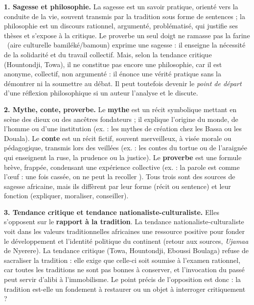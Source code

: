 \documentclass[11pt]{article}
\begin{document}
\begin{corrige}

\textbf{1. Sagesse et philosophie.} La sagesse est un savoir pratique, orienté vers la conduite de la vie, souvent transmis par la tradition sous forme de sentences ; la philosophie est un discours rationnel, argumenté, problématisé, qui justifie ses thèses et s'expose à la critique. Le proverbe \guillemotleft un seul doigt ne ramasse pas la farine \guillemotright\ (aire culturelle bamiléké/bamoun) exprime une sagesse : il enseigne la nécessité de la solidarité et du travail collectif. Mais, selon la tendance critique (Hountondji, Towa), il ne constitue pas encore une philosophie, car il est anonyme, collectif, non argumenté : il énonce une vérité pratique sans la démontrer ni la soumettre au débat. Il peut toutefois devenir le \emph{point de départ} d'une réflexion philosophique si un auteur l'analyse et le discute.

\textbf{2. Mythe, conte, proverbe.} Le \textbf{mythe} est un récit symbolique mettant en scène des dieux ou des ancêtres fondateurs ; il explique l'origine du monde, de l'homme ou d'une institution (ex. : les mythes de création chez les Bassa ou les Douala). Le \textbf{conte} est un récit fictif, souvent merveilleux, à visée morale ou pédagogique, transmis lors des veillées (ex. : les contes du tortue ou de l'araignée qui enseignent la ruse, la prudence ou la justice). Le \textbf{proverbe} est une formule brève, frappée, condensant une expérience collective (ex. : \guillemotleft la parole est comme l'œuf : une fois cassée, on ne peut la recoller \guillemotright). Tous trois sont des sources de sagesse africaine, mais ils diffèrent par leur forme (récit ou sentence) et leur fonction (expliquer, moraliser, conseiller).

\textbf{3. Tendance critique et tendance nationaliste-culturaliste.} Elles s'opposent sur le \textbf{rapport à la tradition}. La tendance nationaliste-culturaliste voit dans les valeurs traditionnelles africaines une ressource positive pour fonder le développement et l'identité politique du continent (retour aux sources, \emph{Ujamaa} de Nyerere). La tendance critique (Towa, Hountondji, Eboussi Boulaga) refuse de sacraliser la tradition : elle exige que celle-ci soit soumise à l'examen rationnel, car toutes les traditions ne sont pas bonnes à conserver, et l'invocation du passé peut servir d'alibi à l'immobilisme. Le point précis de l'opposition est donc : la tradition est-elle un fondement à restaurer ou un objet à interroger critique­ment ?

\end{corrige}
\end{document}
